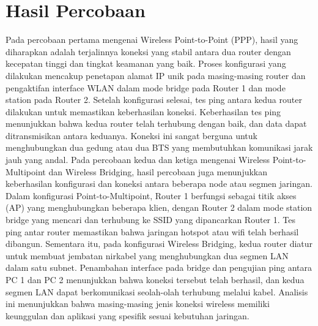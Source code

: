 \section{Hasil Percobaan}
Pada percobaan pertama mengenai Wireless Point-to-Point (PPP), hasil yang diharapkan adalah terjalinnya koneksi yang stabil antara dua router dengan kecepatan tinggi dan tingkat keamanan yang baik. 
Proses konfigurasi yang dilakukan mencakup penetapan alamat IP unik pada masing-masing router dan pengaktifan interface WLAN dalam mode bridge pada Router 1 dan mode station pada Router 2. 
Setelah konfigurasi selesai, tes ping antara kedua router dilakukan untuk memastikan keberhasilan koneksi. Keberhasilan tes ping menunjukkan bahwa kedua router telah terhubung dengan baik, dan data dapat ditransmisikan antara keduanya. 
Koneksi ini sangat berguna untuk menghubungkan dua gedung atau dua BTS yang membutuhkan komunikasi jarak jauh yang andal. Pada percobaan kedua dan ketiga mengenai Wireless Point-to-Multipoint dan Wireless Bridging, hasil percobaan juga menunjukkan keberhasilan konfigurasi dan koneksi antara beberapa node atau segmen jaringan. 
Dalam konfigurasi Point-to-Multipoint, Router 1 berfungsi sebagai titik akses (AP) yang menghubungkan beberapa klien, dengan Router 2 dalam mode station bridge yang mencari dan terhubung ke SSID yang dipancarkan Router 1. Tes ping antar router memastikan bahwa jaringan hotspot atau wifi telah berhasil dibangun. Sementara itu, pada konfigurasi Wireless Bridging, kedua router diatur untuk membuat jembatan nirkabel yang menghubungkan dua segmen LAN dalam satu subnet. 
Penambahan interface pada bridge dan pengujian ping antara PC 1 dan PC 2 menunjukkan bahwa koneksi tersebut telah berhasil, dan kedua segmen LAN dapat berkomunikasi seolah-olah terhubung melalui kabel. Analisis ini menunjukkan bahwa masing-masing jenis koneksi wireless memiliki keunggulan dan aplikasi yang spesifik sesuai kebutuhan jaringan.

